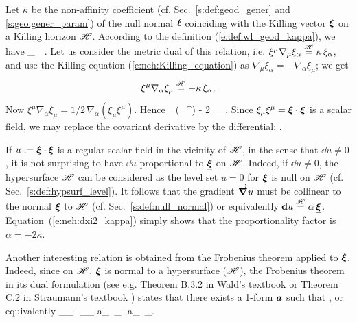 Let $\kappa$ be the non-affinity coefficient
(cf. Sec.~\ref{s:def:geod_gener} and \ref{s:geo:gener_param})
of the null normal $\bm{\ell}$ coinciding with the Killing vector $\bm{\xi}$
on a Killing horizon $\mathscr{H}$. According to the definition
(\ref{e:def:wl_geod_kappa}), we have
\be \label{e:neh:xi_nab_xi_kappa}
    \wnab_{\w{\xi}}\, \w{\xi} \equalH \kappa \, \w{\xi} .
\ee
Let us consider the metric dual of this relation, i.e.
$\xi^\mu \nabla_\mu \xi_\alpha \stackrel{\mathscr{H}}{=} \kappa \, \xi_\alpha$,
and use the Killing equation (\ref{e:neh:Killing_equation}) as
$\nabla_\mu \xi_\alpha = - \nabla_\alpha \xi_\mu$; we get
\[
    \xi^\mu \nabla_\alpha \xi_\mu \stackrel{\mathscr{H}}{=} - \kappa \, \xi_\alpha .
\]
Now $\xi^\mu \nabla_\alpha \xi_\mu = 1/2 \, \nabla_\alpha (\xi_\mu \xi^\mu)$.
Hence
\be
    \nabla_\alpha (\xi_\mu \xi^\mu) \equalH - 2 \kappa \, \xi_\alpha.
\ee
Since $\xi_\mu \xi^\mu = \bm{\xi}\cdot\bm{\xi}$ is a scalar field, we may
replace the covariant derivative by the differential:
\be \label{e:neh:dxi2_kappa}
    \encadre{ \dd (\w{\xi}\cdot\w{\xi}) \equalH - 2 \kappa \, \uu{\xi} } .
\ee

\begin{remark}
If $u:=\bm{\xi}\cdot\bm{\xi}$ is a regular scalar field in the vicinity of $\mathscr{H}$, in the sense
that $\dd u \neq 0$, it is not surprising to have $\dd u$ proportional
to $\underline{\bm{\xi}}$ on $\mathscr{H}$. Indeed, if $\dd u \neq 0$, the hypersurface $\mathscr{H}$ can be considered
as the level set $u=0$ for $\bm{\xi}$ is null on $\mathscr{H}$ (cf. Sec.~\ref{s:def:hypsurf_level}).
It follows that the gradient $\overrightarrow{\bm{\nabla}} u$ must be collinear to
the normal $\bm{\xi}$ to $\mathscr{H}$ (cf. Sec.~\ref{s:def:null_normal}) or equivalently
$\mathbf{d} u \stackrel{\mathscr{H}}{=} \alpha\, \underline{\bm{\xi}}$. Equation~(\ref{e:neh:dxi2_kappa}) simply shows
that the proportionality factor is $\alpha = -2\kappa$.
\end{remark}

Another interesting relation is obtained from the Frobenius theorem
applied to $\bm{\xi}$. Indeed, since on $\mathscr{H}$, $\bm{\xi}$ is normal to a hypersurface
($\mathscr{H}$), the Frobenius theorem in its dual formulation
(see e.g.
Theorem B.3.2 in Wald's textbook \cite{Wald84} or Theorem C.2 in
Straumann's textbook \cite{Strau13}) states that there exists a 1-form
$\bm{a}$ such that
\be
    \dd \uu{\xi} \equalH {} \wedge \uu{\xi} ,
\ee
or equivalently
\be \label{e:neh:Frobenius_xi}
  \nabla_\alpha \xi_\beta - \nabla_\beta \xi_\alpha \equalH
  a_\alpha \, \xi_\beta -  a_\beta  \, \xi_\alpha  .
\ee

